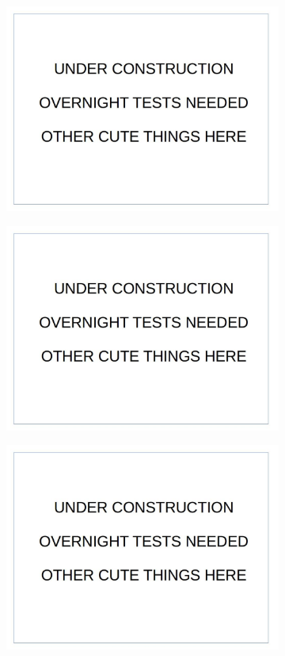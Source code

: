 \documentclass[12pt]{report}
\begin{document}
\begin{figure}
\begin{subfigure}{.49\linewidth}
  \includegraphics[width=1\linewidth]{figures/placeholder.jpg}
  \caption{}
\end{subfigure}
\hfill
\begin{subfigure}{.49\linewidth}
  \includegraphics[width=1\linewidth]{figures/placeholder.jpg}
  \caption{}
\end{subfigure}
\hfill
\begin{subfigure}{.49\linewidth}
  \includegraphics[width=1\linewidth]{figures/placeholder.jpg}

\end{subfigure}
\end{figure}
\end{document}
